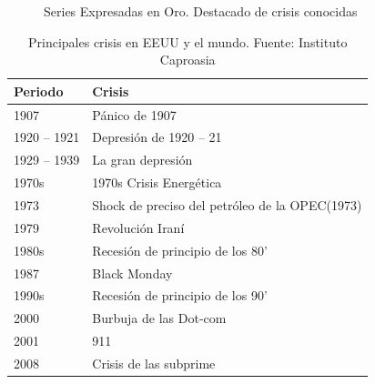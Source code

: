 \documentclass[a4paper]{article}
\begin{document}
\begin{figure}[H]
	\centering
	\caption{Series Expresadas en Oro. Destacado de crisis conocidas} \label{fig:series_crisis}
\end{figure}



\begin{table}[ht]
	\centering
	\begin{tabular}{ll}
		\hline
		Periodo & Crisis \\ 
		\hline
		1907 & Pánico de 1907 \\ 
		1920 – 1921 & Depresión de 1920 – 21 \\ 
		1929 – 1939 & La gran depresión \\ 
		1970s & 1970s Crisis Energética \\ 
		1973 & Shock de preciso del petróleo de la OPEC(1973) \\ 
		1979 & Revolución Iraní\\ 
		1980s & Recesión de principio de los 80'\\ 
		1987 & Black Monday \\ 
		1990s & Recesión de principio de los 90'\\ 
		2000 & Burbuja de las Dot-com \\ 
		2001 & 911 \\ 
		2008 & Crisis de las subprime \\ 
		\hline
	\end{tabular}
\caption{Principales crisis en EEUU y el mundo. Fuente: Instituto Caproasia}
\label{tabla_crisis}
\end{table}
\end{document}
